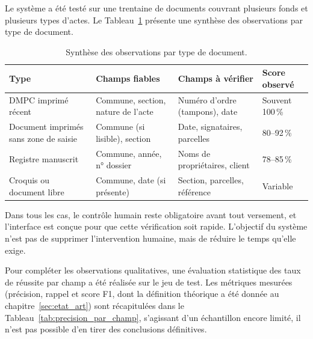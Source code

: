 Le système a été testé sur une trentaine de documents couvrant plusieurs fonds et plusieurs types d'actes. Le Tableau~\ref{tab:qualite_extraction} présente une synthèse des observations par type de document.

\begin{table}[H]
  \centering
  \caption{Synthèse des observations par type de document.}
  \label{tab:qualite_extraction}
  \small
  \begin{tabular}{p{3cm}p{3.5cm}p{3.5cm}p{2.5cm}}
    \toprule
    \textbf{Type} & \textbf{Champs fiables} & \textbf{Champs à vérifier} & \textbf{Score observé} \\
    \midrule
    DMPC imprimé récent & Commune, section, nature de l'acte & Numéro d'ordre (tampons), date & Souvent 100\,\% \\
    \addlinespace
    Document imprimés sans zone de saisie & Commune (si lisible), section & Date, signataires, parcelles & 80--92\,\% \\
    \addlinespace
    Registre manuscrit & Commune, année, n° dossier & Noms de propriétaires, client & 78--85\,\% \\
    \addlinespace
    Croquis ou document libre & Commune, date (si présente) & Section, parcelles, référence & Variable \\
    \bottomrule
  \end{tabular}
\end{table}

Dans tous les cas, le contrôle humain reste obligatoire avant tout versement, et l'interface est conçue pour que cette vérification soit rapide. L'objectif du système n'est pas de supprimer l'intervention humaine, mais de réduire le temps qu'elle exige.

Pour compléter les observations qualitatives, une évaluation statistique des taux de réussite par champ a été réalisée sur le jeu de test. Les métriques mesurées (précision, rappel et score F1, dont la définition théorique a été donnée au chapitre~\ref{sec:etat_art}) sont récapitulées dans le Tableau~\ref{tab:precision_par_champ}, s'agissant d'un échantillon encore limité, il n'est pas possible d'en tirer des conclusions définitives.


